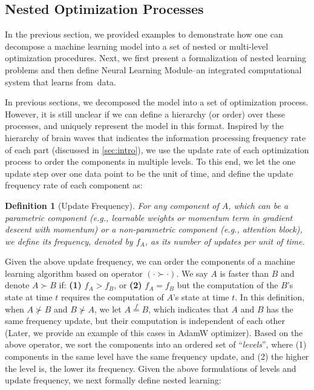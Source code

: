 \documentclass{article}
\newtheorem{dfn}{Definition}
\begin{document}
\subsection{Nested Optimization Processes}\label{sec:nop}
In the previous section, we provided examples to demonstrate how one can decompose a machine learning model into a set of nested or multi-level optimization procedures. Next, we first  present a formalization of nested learning problems and then define Neural Learning Module–an integrated computational system that learns from~data.    

In previous sections,  we decomposed the model into a set of optimization process. However, it is still unclear if we can define a hierarchy (or order) over these processes, and {uniquely represent the model in this format.} Inspired by the hierarchy of brain waves that indicates the information processing frequency rate of each part (discussed in \autoref{sec:intro}), we use the update rate of each optimization process to order the components in multiple levels. To this end, we let the one update step over one data point to be the unit of time, and define the update frequency rate of each component as: 
\begin{dfn}[Update Frequency]\label{dfn:uf}
    For any component of $A$, which can be a parametric component (e.g., learnable weights or momentum term in gradient descent with momentum) or a non-parametric component (e.g., attention block), we define its frequency, denoted by $f_A$, as its number of updates per unit of time.   
\end{dfn}
Given the above update frequency, we can order the components of a machine learning algorithm based on operator $(\cdot \succ \cdot)$. We say $A$ is faster than $B$ and denote $A \succ B$ if: \textbf{(1)}  $f_A > f_B$, or \textbf{(2)} $f_A = f_B$ but the computation of the $B$'s state at time $t$ requires the computation of $A$'s state at time $t$. In this definition, when $A \nsucc B$ and $B \nsucc A$, we let $A \overset{f}{=} B$, which indicates that $A$ and $B$ has the same frequency update, but their computation is independent of each other (Later, we provide an example of this cases in AdamW optimizer).  Based on the above operator, we sort the components into an ordered set of ``\emph{levels}'', where (1) components in the same level have the same frequency update, and (2) the higher the level is, the lower its frequency. Given the above formulations of levels and update frequency, we next formally define nested learning:
\end{document}
